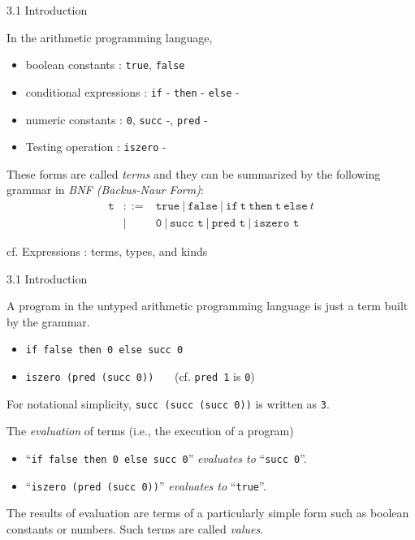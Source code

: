 \documentclass[table]{beamer}
\begin{document}
\begin{frame}[t]{3.1 Introduction} \vspace{10pt}

In the arithmetic programming language,
\begin{itemize}
\item boolean constants : \texttt{true}, \texttt{false}
\item conditional expressions : \texttt{if} - \texttt{then} - \texttt{else} -
\item numeric constants : \texttt{0}, \texttt{succ} -, \texttt{pred} -
\item Testing operation : \texttt{iszero} - 
\end{itemize}

\vspace{10pt}

These forms are called {\it terms} and they can be summarized by the following grammar in {\it BNF (Backus-Naur Form)}:
\begin{eqnarray*}
\texttt{t} & ::= & \texttt{true} \ | \ 
 \texttt{false} \ | \ 
 \texttt{if} \ \texttt{t} \ \texttt{then} \ \texttt{t} \ \texttt{else} \ t \\
 & | & \texttt{0} \ | \ 
 \texttt{succ t} \ | \ 
 \texttt{pred t} \ | \ 
 \texttt{iszero t} 
\end{eqnarray*}

cf. Expressions : terms, types, and kinds

\end{frame}

\begin{frame}[t]{3.1 Introduction} \vspace{10pt}

A program in the untyped arithmetic programming language is just a term built by the grammar. 
\begin{itemize}
\item \texttt{if false then 0 else succ 0}
\item \texttt{iszero (pred (succ 0))} \ \ \ (cf. \texttt{pred 1} is \texttt{0})
\end{itemize}

\vspace{10pt}

For notational simplicity, \texttt{succ (succ (succ 0))} is written as \texttt{3}.

\vspace{10pt}

The {\it evaluation} of terms (i.e., the execution of a program)
\begin{itemize}
\item ``\texttt{if false then 0 else succ 0}'' {\it evaluates to} ``\texttt{succ 0}''.
\item ``\texttt{iszero (pred (succ 0))}'' {\it evaluates to} ``\texttt{true}''.
\end{itemize}

\vspace{10pt}

The results of evaluation are terms of a particularly simple form such as boolean constants or numbers. Such terms are called {\it values}.

\end{frame}
\end{document}
